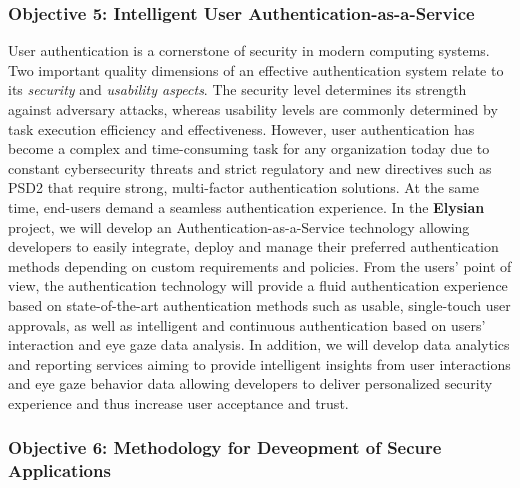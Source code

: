 \documentclass[a4paper,11pt]{article}
\newcommand{\project}[1]{\textbf{#1}\xspace}
\newcommand{\SECURITY}{\project{Elysian}}
\newcommand{\TheProject}{\SECURITY}
\begin{document}
\subsubsection*{Objective 5: Intelligent User Authentication-as-a-Service}
\vspace{-6pt}

User authentication is a cornerstone of security in modern computing systems. Two important quality dimensions of an effective authentication system relate to its \textit{security} and \textit{usability aspects}. The security level determines its strength against adversary attacks, whereas usability levels are commonly determined by task execution efficiency and effectiveness. However, user authentication has become a complex and time-consuming task for any organization today due to constant cybersecurity threats and strict regulatory and new directives such as PSD2 that require strong, multi-factor authentication solutions. At the same time, end-users demand a seamless authentication experience. In the \TheProject{} project, we will develop an Authentication-as-a-Service technology allowing developers to easily integrate, deploy and manage their preferred authentication methods depending on custom requirements and policies. From the users’ point of view, the authentication technology will provide a fluid authentication experience based on state-of-the-art authentication methods such as usable, single-touch user approvals, as well as intelligent and continuous authentication based on users' interaction and eye gaze data analysis. In addition, we will develop data analytics and reporting services aiming to provide intelligent insights from user interactions and eye gaze behavior data allowing developers to deliver personalized security experience and thus increase user acceptance and trust.

\subsubsection*{Objective 6: Methodology for Deveopment of Secure Applications}
\vspace{-6pt}
\end{document}
